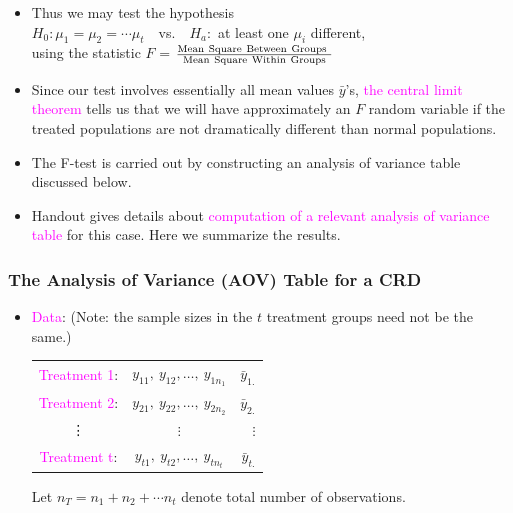 \documentclass[xcolor=dvipsnames,12pt]{beamer}
\begin{document}
\begin{frame}
\begin{itemize}
\item Thus we may test the hypothesis\\[.1in]
\hspace*{.2in} $H_0: \mu_1 = \mu_2 = \cdots \mu_t$\ \ vs.\ \ $H_a:$ at least one $\mu_i$ different, \\[.1in]
using the statistic $F$ = $\frac{\rm{Mean~ Square~ Between~ Groups~}}{\rm{Mean~ Square~ Within~ Groups}}$ 
\item Since our test involves essentially all mean values
$\bar{y}$'s,  \textcolor{magenta}{the central limit theorem} tells us that we will have
approximately an $F$ random variable if the treated populations
are not dramatically different than normal populations.
\item The F-test is carried out by constructing an analysis of variance table discussed below.
\item  Handout gives details
about \textcolor{magenta}{computation of a relevant analysis of variance table} for this case. Here we summarize the results.
\end{itemize}
\end{frame}

\begin{frame}
\frametitle{The Analysis of Variance (AOV) Table for a CRD}
\begin{itemize}
\item \textcolor{magenta}{Data}: (Note: the sample sizes in the $t$ treatment groups need not be the same.)
  \begin{center}
  \begin{tabular}{cc|r}
  \textcolor{magenta}{Treatment 1}: & $y_{11},\ y_{12}, \ldots,\ y_{1n_{1}}$ & $\bar{y}_{1.}$\\
  \textcolor{magenta}{Treatment 2}: & $y_{21},\ y_{22}, \ldots,\ y_{2n_{2}}$ & $\bar{y}_{2.}$\\
   \vdots  &     $\vdots$ & $\vdots$\\
  \textcolor{magenta}{Treatment  t}: & $y_{t1},\ y_{t2}, \ldots,\ y_{tn_{t}}$& $\bar{y}_{t.}$
  \end{tabular}
  \end{center}
  Let $n_T = n_1 + n_2 + \cdots n_t$ denote total number
  of observations.
\end{itemize}
\end{frame}
 
\end{document}
